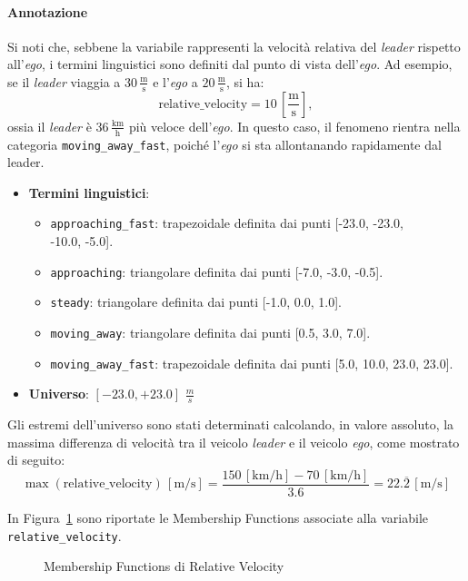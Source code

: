 \paragraph{Annotazione} Si noti che, sebbene la variabile rappresenti la velocità relativa del \emph{leader} rispetto all'\emph{ego}, 
i termini linguistici sono definiti dal punto di vista dell'\emph{ego}. Ad esempio, se il \emph{leader} viaggia a $30\,\frac{\mathrm{m}}{\mathrm{s}}$ e 
l'\emph{ego} a $20\,\frac{\mathrm{m}}{\mathrm{s}}$, si ha:
\[
\text{relative\_velocity} = 10\,[\frac{\mathrm{m}}{\mathrm{s}}],
\]
ossia il \emph{leader} è $36\,\frac{\mathrm{km}}{\mathrm{h}}$ più veloce dell'\emph{ego}. In questo caso, il fenomeno rientra nella categoria 
\texttt{moving\_away\_fast}, poiché l'\emph{ego} si sta allontanando rapidamente dal leader.
\begin{itemize}
  \item \textbf{Termini linguistici}:
    \begin{itemize}
      \item \texttt{approaching\_fast}: trapezoidale definita dai punti [-23.0, -23.0, \\ -10.0, -5.0].
      \item \texttt{approaching}: triangolare definita dai punti [-7.0, -3.0, -0.5].
      \item \texttt{steady}: triangolare definita dai punti [-1.0, 0.0, 1.0].
      \item \texttt{moving\_away}: triangolare definita dai punti [0.5, 3.0, 7.0].
      \item \texttt{moving\_away\_fast}: trapezoidale definita dai punti [5.0, 10.0, 23.0, 23.0].
    \end{itemize}
  \item \textbf{Universo}: \([-23.0,+23.0]\) $\frac{m}{s}$
\end{itemize}
Gli estremi dell'universo sono stati determinati calcolando, in valore assoluto, la massima differenza di velocità tra il veicolo
\emph{leader} e il veicolo \emph{ego}, come mostrato di seguito:
\[
  \max(\text{relative\_velocity}) \,[\mathrm{m}/\mathrm{s}]
  = \frac{150\,[\mathrm{km}/\mathrm{h}] - 70\,[\mathrm{km}/\mathrm{h}]}{3.6}
  = 22.\overline{2}\,[\mathrm{m}/\mathrm{s}]
\]

\noindent In Figura~\ref{Fig:mf_relative_velocity} sono riportate le Membership Functions associate alla variabile \texttt{relative\_velocity}.
\begin{figure}[H]
    \centering
    \caption{Membership Functions di Relative Velocity}
    \label{Fig:mf_relative_velocity}
\end{figure}

